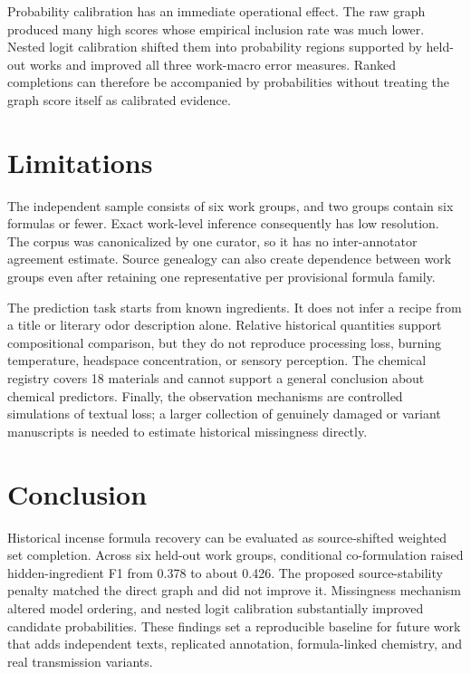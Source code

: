 \documentclass[11pt,a4paper]{article}
\begin{document}
Probability calibration has an immediate operational effect. The raw graph produced many high scores whose empirical inclusion rate was much lower. Nested logit calibration shifted them into probability regions supported by held-out works and improved all three work-macro error measures. Ranked completions can therefore be accompanied by probabilities without treating the graph score itself as calibrated evidence.

\section{Limitations}

The independent sample consists of six work groups, and two groups contain six formulas or fewer. Exact work-level inference consequently has low resolution. The corpus was canonicalized by one curator, so it has no inter-annotator agreement estimate. Source genealogy can also create dependence between work groups even after retaining one representative per provisional formula family.

The prediction task starts from known ingredients. It does not infer a recipe from a title or literary odor description alone. Relative historical quantities support compositional comparison, but they do not reproduce processing loss, burning temperature, headspace concentration, or sensory perception. The chemical registry covers 18 materials and cannot support a general conclusion about chemical predictors. Finally, the observation mechanisms are controlled simulations of textual loss; a larger collection of genuinely damaged or variant manuscripts is needed to estimate historical missingness directly.

\section{Conclusion}

Historical incense formula recovery can be evaluated as source-shifted weighted set completion. Across six held-out work groups, conditional co-formulation raised hidden-ingredient F1 from 0.378 to about 0.426. The proposed source-stability penalty matched the direct graph and did not improve it. Missingness mechanism altered model ordering, and nested logit calibration substantially improved candidate probabilities. These findings set a reproducible baseline for future work that adds independent texts, replicated annotation, formula-linked chemistry, and real transmission variants.
\end{document}
